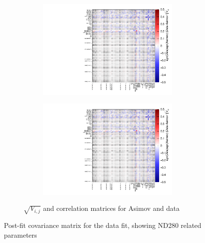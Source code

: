 \begin{figure}[h]
\begin{subfigure}[t]{\textwidth}
	\begin{subfigure}[t]{0.49\textwidth}
		\includegraphics[width=\textwidth, trim={0mm 0mm 0mm 0mm}, clip,page=1]{figures/mach3/data/corr/data_asimov_corr_ratio}
	\end{subfigure}
	\begin{subfigure}[t]{0.49\textwidth}
		\includegraphics[width=\textwidth, trim={0mm 0mm 0mm 0mm}, clip,page=2]{figures/mach3/data/corr/data_asimov_corr_ratio}
	\end{subfigure}
	\caption{$\sqrt{V_{i,j}}$ and correlation matrices for Asimov and data}
\end{subfigure}
\caption{Post-fit covariance matrix for the data fit, showing ND280 related parameters}
\label{fig:postfit_corr_nd280}
\end{figure}


